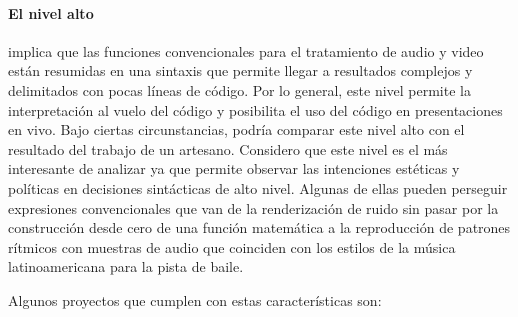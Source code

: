 \paragraph{El nivel alto} implica que las funciones convencionales para el tratamiento de audio y video están resumidas en una sintaxis que permite llegar a resultados complejos y delimitados con pocas líneas de código. Por lo general, este nivel permite la interpretación al vuelo del código y posibilita el uso del código en presentaciones en vivo. Bajo ciertas circunstancias, podría comparar este nivel alto con el resultado del trabajo de un artesano. Considero que este nivel es el más interesante de analizar ya que permite observar las intenciones estéticas y políticas en decisiones sintácticas de alto nivel. Algunas de ellas pueden perseguir expresiones convencionales que van de la renderización de ruido sin pasar por la construcción desde cero de una función matemática a la reproducción de patrones rítmicos con muestras de audio que coinciden  con los estilos de la música latinoamericana para la pista de baile. %

Algunos proyectos que cumplen con estas características son: 


